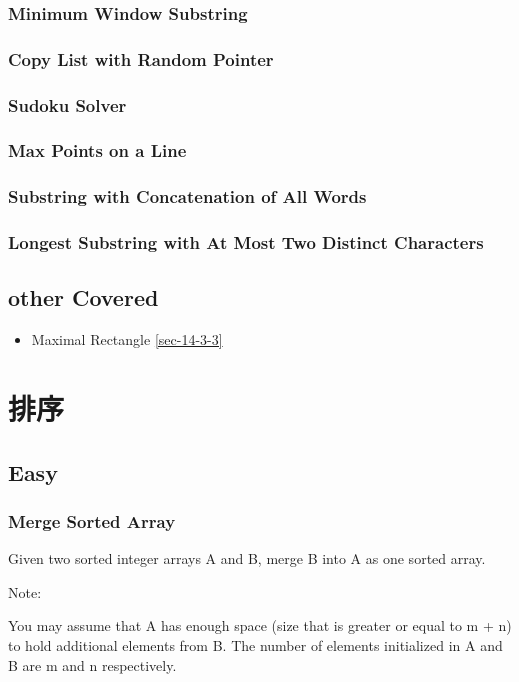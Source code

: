 \documentclass[12pt]{book}
\begin{document}
\subsection{Minimum Window Substring}
\label{sec-6-3-1}
\subsection{Copy List with Random Pointer}
\label{sec-6-3-2}
\subsection{Sudoku Solver}
\label{sec-6-3-3}
\subsection{Max Points on a Line}
\label{sec-6-3-4}
\subsection{Substring with Concatenation of All Words}
\label{sec-6-3-5}
\subsection{Longest Substring with At Most Two Distinct Characters}
\label{sec-6-3-6}
\section{other Covered}
\label{sec-6-4}
\begin{itemize}
\item Maximal Rectangle
\ref{sec-14-3-3}
\end{itemize}
\chapter{排序}
\label{sec-7}
\section{Easy}
\label{sec-7-1}
\subsection{Merge Sorted Array}
\label{sec-7-1-1}
Given two sorted integer arrays A and B, merge B into A as one sorted array.

Note:

You may assume that A has enough space (size that is greater or equal to m + n) to hold additional elements from B. The number of elements initialized in A and B are m and n respectively.
\end{document}
